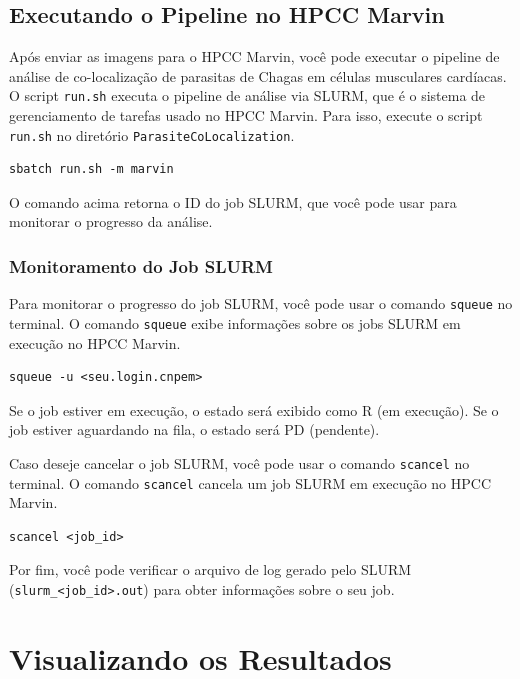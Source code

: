 \documentclass{article}
\begin{document}
\subsection{Executando o Pipeline no HPCC Marvin}

Após enviar as imagens para o HPCC Marvin, você pode executar o pipeline de análise de co-localização de parasitas de Chagas em células musculares cardíacas. O script \texttt{run.sh} executa o pipeline de análise via SLURM, que é o sistema de gerenciamento de tarefas usado no HPCC Marvin. Para isso, execute o script \texttt{run.sh} no diretório \texttt{ParasiteCoLocalization}.

\begin{verbatim}
sbatch run.sh -m marvin
\end{verbatim}

O comando acima retorna o ID do job SLURM, que você pode usar para monitorar o progresso da análise.

\subsubsection{Monitoramento do Job SLURM}

Para monitorar o progresso do job SLURM, você pode usar o comando \texttt{squeue} no terminal. O comando \texttt{squeue} exibe informações sobre os jobs SLURM em execução no HPCC Marvin.

\begin{verbatim}
squeue -u <seu.login.cnpem>
\end{verbatim}

Se o job estiver em execução, o estado será exibido como R (em execução). Se o job estiver aguardando na fila, o estado será PD (pendente).

Caso deseje cancelar o job SLURM, você pode usar o comando \texttt{scancel} no terminal. O comando \texttt{scancel} cancela um job SLURM em execução no HPCC Marvin.

\begin{verbatim}
scancel <job_id>
\end{verbatim}

Por fim, você pode verificar o arquivo de log gerado pelo SLURM (\texttt{slurm\_<job\_id>.out}) para obter informações sobre o seu job.

\section{Visualizando os Resultados}
\end{document}
